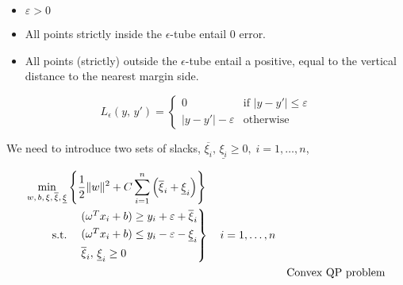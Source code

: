 \begin{itemize}
	\item $\varepsilon > 0$
	\item All points strictly inside the $\epsilon$-tube entail 0 error.
	\item All points (strictly) outside the $\epsilon$-tube entail a positive,
	      equal to the vertical distance to the nearest margin side.
\end{itemize}

\begin{equation*}
	L_{\epsilon} (y,\,y') = \begin{cases}
		0                      & \text{if } |y - y'| \leq \varepsilon \\
		|y - y'| - \varepsilon & \text{otherwise }
	\end{cases}
\end{equation*}

We need to introduce two sets of slacks,
$\overline{\xi_i},\, \underline{\xi_i} \geq 0,\; i=1,\dots,n$,

\begin{align*}
	\min_{w,\,b,\,\xi,\,\overline{\xi},\,\underline{\xi}} &
	\left\{ \frac{1}{2} \|w\|^2 +
	C \sum_{i=1}^n \left(\overline{\xi}_i + \underline{\xi}_i \right) \right\}                                                  \\
	\text{s.t.}                                           & \quad \begin{rcases*}
		                                                              (\omega^T x_i + b) \geq y_i + \varepsilon + \overline{\xi}_i  \\
		                                                              (\omega^T x_i + b) \leq y_i - \varepsilon - \underline{\xi}_i \\
		                                                              \overline{\xi}_i,\, \underline{\xi}_i \geq 0
	                                                              \end{rcases*} \quad i=1,\dots,n \\
                                                        && \text{Convex QP problem}
\end{align*}

